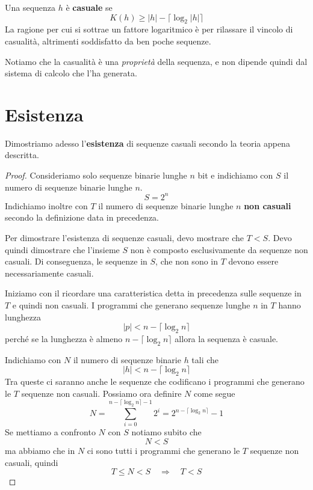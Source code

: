 \begin{definition}
	Una sequenza $h$ \`e \textbf{casuale} se
	\[ K(h) \geq |h| - \lceil \log_2 |h| \rceil \]
	La ragione per cui si sottrae un fattore logaritmico \`e per rilassare il vincolo di casualit\`a, altrimenti
	soddisfatto da ben poche sequenze.
\end{definition}

Notiamo che la casualit\`a \`e una \emph{propriet\`a} della sequenza, e non dipende quindi dal sistema di calcolo
che l'ha generata.

\section{Esistenza}
Dimostriamo adesso l'\textbf{esistenza} di sequenze casuali secondo la teoria appena descritta.

\begin{proof}
	Consideriamo solo sequenze binarie lunghe $n$ bit e indichiamo con $S$ il numero di sequenze binarie lunghe $n$.
	\[ S = 2^n \]
	Indichiamo inoltre con $T$ il numero di sequenze binarie lunghe $n$ \textbf{non casuali} secondo la definizione data
	in precedenza.

	Per dimostrare l'esistenza di sequenze casuali, devo mostrare che $T < S$. Devo quindi dimostrare che l'insieme $S$
	non \`e composto esclusivamente da sequenze non casuali. Di conseguenza, le sequenze in $S$, che non sono in $T$
	devono essere necessariamente casuali.

	Iniziamo con il ricordare una caratteristica detta in precedenza sulle sequenze in $T$ e quindi non casuali. I
	programmi che generano sequenze lunghe $n$ in $T$ hanno lunghezza
	\[ |p| < n - \lceil \log_2 n \rceil \]
	perch\'e se la lunghezza \`e almeno $n - \lceil \log_2 n \rceil$ allora la sequenza \`e casuale.

	Indichiamo con $N$ il numero di sequenze binarie $h$ tali che
	\[ |h| < n - \lceil \log_2 n \rceil \]
	Tra queste ci saranno anche le sequenze che codificano i programmi che generano le $T$ sequenze non casuali. Possiamo
	ora definire $N$ come segue
	\[ N = \sum_{i=0}^{n - \lceil \log_2 n \rceil - 1} 2^i = 2^{n - \lceil \log_2 n \rceil} - 1 \]
	Se mettiamo a confronto $N$ con $S$ notiamo subito che
	\[ N < S \]
	ma abbiamo che in $N$ ci sono tutti i programmi che generano le $T$ sequenze non casuali, quindi
	\[ T \leq N < S \quad \Rightarrow \quad T < S \]
\end{proof}

